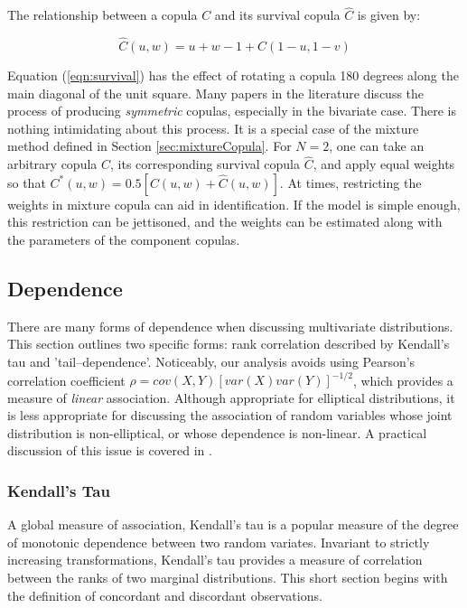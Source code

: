 \documentclass[12pt]{article}
\begin{document}
The relationship between a copula $C$ and its survival copula $\hat{C}$ is given by:

\begin{equation} \label{eqn:survival}
	\hat{C}\left( u,w\right) =u+w-1+C\left( 1-u,1-v\right)
\end{equation}

Equation (\ref{eqn:survival}) has the effect of rotating a copula 180 degrees along the main diagonal of the unit square. Many papers in the literature discuss the process of producing \textit{symmetric} copulas, especially in the bivariate case. There is nothing intimidating about this process. It is a special case of the mixture method defined in Section \ref{sec:mixtureCopula}. For $N=2$, one can take an arbitrary copula $C$, its corresponding survival copula $\hat{C}$, and apply equal weights so that $C^{\ast}\left(u,w\right) = 0.5\left[ C\left(u,w\right) +\hat{C}\left(u,w\right)\right]$. At times, restricting the weights in mixture copula can aid in identification. If the model is simple enough, this restriction can be jettisoned, and the weights can be estimated along with the parameters of the component copulas.

\subsection{Dependence}

There are many forms of dependence when discussing multivariate distributions. This section outlines two specific forms: rank correlation described by Kendall's tau and 'tail--dependence'. Noticeably, our analysis avoids using Pearson's correlation coefficient $\rho = cov\left(X,Y\right)\left[var\left(X\right)var\left(Y\right)\right]^{-1/2}$, which provides a measure of \textit{linear} association. Although appropriate for elliptical distributions, it is less appropriate for discussing the association of random variables whose joint distribution is non-elliptical, or whose dependence is non-linear. A practical discussion of this issue is covered in \cite{Embrechts_McNeil_Straumann_2002}.

\subsubsection{Kendall's Tau}

A global measure of association, Kendall's tau is a popular measure of the degree of monotonic dependence between two random variates. Invariant to strictly increasing transformations, Kendall's tau provides a measure of correlation between the ranks of two marginal distributions. This short section begins with the definition of concordant and discordant observations.
\end{document}
